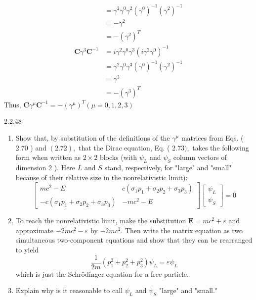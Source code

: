 \documentclass{article}
\begin{document}
\begin{flushleft}
$$\begin{aligned}
&=\gamma^{2} \gamma^{0} \gamma^{2}\left(\gamma^{0}\right)^{-1}\left(\gamma^{2}\right)^{-1} \\
&=-\gamma^{2} \\
&=-\left(\gamma^{2}\right)^{T} \\
\mathbf{C} \gamma^{3} \mathbf{C}^{-1} &=i \gamma^{2} \gamma^{0} \gamma^{3}\left(i \gamma^{2} \gamma^{0}\right)^{-1} \\
&=\gamma^{2} \gamma^{0} \gamma^{3}\left(\gamma^{0}\right)^{-1}\left(\gamma^{2}\right)^{-1} \\
&=\gamma^{3} \\
&=-\left(\gamma^{3}\right)^{T}
\end{aligned}
$$
Thus, $\mathbf{C} \gamma^{\mu} \mathbf{C}^{-1}=-\left(\gamma^{\mu}\right)^{T}(\mu=0,1,2,3)$

\newpage


\begin{mybox}{2.2.48}
\begin{enumerate}[$(a)$]
\item Show that, by substitution of the definitions of the $\gamma^{\mu}$ matrices from Eqs. ( 2.70 ) and $(2.72),$ that the Dirac equation, Eq. ( 2.73$),$ takes the following form when written as $2 \times 2$ blocks (with $\psi_{L}$ and $\psi_{S}$ column vectors of dimension 2 ). Here $L$ and $S$ stand, respectively, for "large" and "small" because of their relative size in the nonrelativistic limit):
$$
\begin{bmatrix}
m c^{2}-E & c\left(\sigma_{1} p_{1}+\sigma_{2} p_{2}+\sigma_{3} p_{3}\right) \\
-c\left(\sigma_{1} p_{1}+\sigma_{2} p_{2}+\sigma_{3} p_{3}\right) & -m c^{2}-E
\end{bmatrix}\begin{bmatrix}
\psi_{L} \\
\psi_{S}
\end{bmatrix}=0
$$
\item To reach the nonrelativistic limit, make the substitution $\mathbf{E}=m c^{2}+\varepsilon$ and approximate $-2 m c^{2}-\varepsilon$ by $-2 m c^{2}$. Then write the matrix equation as two simultaneous two-component equations and show that they can be rearranged to yield
$$
\frac{1}{2 m}\left(p_{1}^{2}+p_{2}^{2}+p_{3}^{2}\right) \psi_{L}=\varepsilon \psi_{L}
$$
which is just the Schrödinger equation for a free particle.
\item Explain why is it reasonable to call $\psi_{L}$ and $\psi_{S}$ "large" and "small."
\end{enumerate}
\end{mybox}




\end{flushleft}
\end{document}

